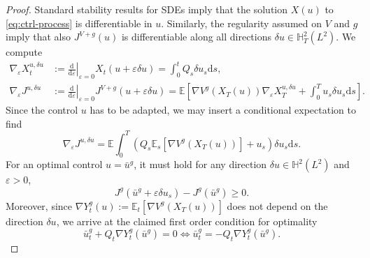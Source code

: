 \documentclass[11pt, a4paper]{scrartcl}
\numberwithin{equation}{section}
\theoremstyle{plain}
\theoremstyle{remark}
\newcommand{\assign}{:=}
\newcommand{\mathd}{\mathrm{d}}
\begin{document}
\begin{proof}
	Standard stability results for SDEs imply that the solution $X (u)$ to
	\eqref{eq:ctrl-process} is differentiable in $u$. Similarly, the regularity
	assumed on $V$ and $g$ imply that also $J^{V + g} (u)$ is differentiable
	along all directions $\delta u \in \mathbb{H}^2_T (L^2)$. We compute
	\begin{align*}
		\nabla_{\varepsilon} X_t^{u, \delta u} & \assign \left.
		\frac{\mathd}{\mathd \varepsilon} \right|_{\varepsilon = 0} X_t (u +
		\varepsilon \delta u) = \int_0^t Q_s \delta u_s \mathd s, \\
		\nabla_{\varepsilon} J^{u, \delta u}   & \assign \left.
		\frac{\mathd}{\mathd \varepsilon} \right|_{\varepsilon = 0} J^{V + g}
		(u + \varepsilon \delta u) =\mathbb{E} \left[ \nabla V^g (X_T (u))
			\nabla_{\varepsilon} X^{u, \delta u}_T + \int_0^T u_s \delta u_s \mathd
			s \right].
	\end{align*}
	Since the control $u$ has to be adapted, we may insert a conditional
	expectation to find
	\begin{equation}
		\nabla_{\varepsilon} J^{u, \delta u}
		= \mathbb{E} \int_0^T (Q_s \mathbb{E}_s [\nabla V^g (X_T (u))] + u_s)
		\delta u_s \mathd s. \label{eq:EL-der}
	\end{equation}
	For an optimal control $u = \bar{u}^g$, it must hold for any direction
	$\delta u \in \mathbb{H}^2 (L^2)$ and $\varepsilon > 0$,
	\[ J^g (\bar{u}^g + \varepsilon \delta u_s) - J^g (\bar{u}^g) \geqslant 0.
	\]
	Moreover, since $\nabla Y_t^g (u) \assign \mathbb{E}_t [\nabla V^g (X_T
		(u))]$ does not depend on the direction $\delta u$, we arrive at the claimed
	first order condition for optimality
	\[ \bar{u}^g_t + Q_t \nabla Y^g_t (\bar{u}^g) = 0 \Leftrightarrow
		\bar{u}^g_t = - Q_t \nabla Y_t^g (\bar{u}^g) . \]
\end{proof}
\end{document}
